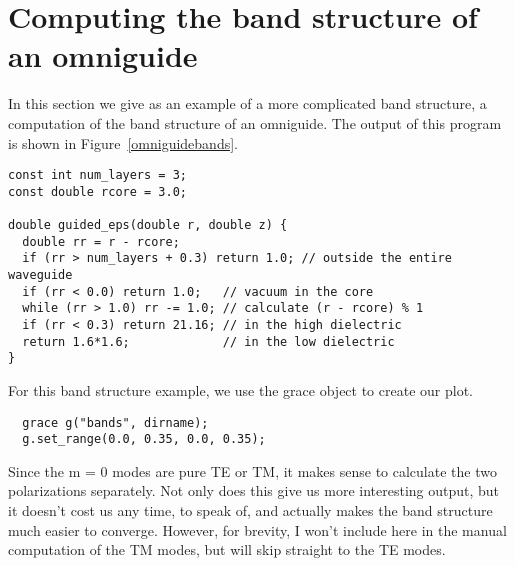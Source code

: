 \begin{comment}
#include <stdio.h>
#include <stdlib.h>

#include "dactyl.h"

const int a = 10;
\end{comment}

\section{Computing the band structure of an omniguide}

In this section we give as an example of a more complicated band structure,
a computation of the band structure of an omniguide.  The output of this
program is shown in Figure~\ref{omniguidebands}.

\begin{verbatim}
const int num_layers = 3;
const double rcore = 3.0;

double guided_eps(double r, double z) {
  double rr = r - rcore;
  if (rr > num_layers + 0.3) return 1.0; // outside the entire waveguide
  if (rr < 0.0) return 1.0;   // vacuum in the core
  while (rr > 1.0) rr -= 1.0; // calculate (r - rcore) % 1
  if (rr < 0.3) return 21.16; // in the high dielectric
  return 1.6*1.6;             // in the low dielectric
}
\end{verbatim}

\begin{comment}
int main(int argc, char **argv) {
  deal_with_ctrl_c();
  printf("Running omniguide!\n");

  const double ttot = 1000.0;
  mat ma(guided_eps, rcore + num_layers + 0.3, 0.0, a);
  const char *dirname = make_output_directory(argv[0]);
\end{comment}

For this band structure example, we use the grace object to create our
plot.
\begin{verbatim}
  grace g("bands", dirname);
  g.set_range(0.0, 0.35, 0.0, 0.35);
\end{verbatim}
\begin{comment}
  ma.set_output_directory(dirname);
  mat vac(&ma);
  vac.make_average_eps();
\end{comment}

Since the m = 0 modes are pure TE or TM, it makes sense to calculate the
two polarizations separately.  Not only does this give us more interesting
output, but it doesn't cost us any time, to speak of, and actually makes
the band structure much easier to converge.  However, for brevity, I won't
include here in the manual computation of the TM modes, but will skip
straight to the TE modes.

